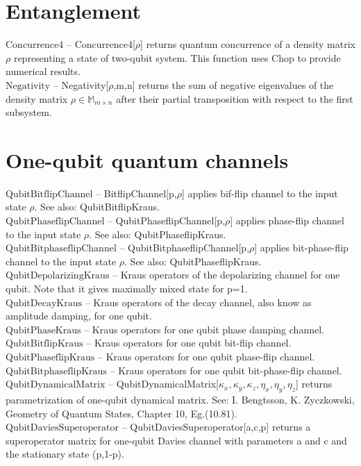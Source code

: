 \documentclass[a4paper,10pt]{scrartcl}
\begin{document}
\section{Entanglement}

\noindent\textbf{$ \text{Concurrence4} $ }-- Concurrence4[$\rho $] returns quantum concurrence of a density matrix $\rho $ representing a state of two-qubit system. This function uses Chop to provide numerical results.$  $\\[8pt]
\noindent\textbf{$ \text{Negativity} $ }-- Negativity[$\rho $,m,n] returns the sum of negative eigenvalues of the density matrix $\rho \in $$ \mathbb{M}_{m\times n} $ after their partial transposition with respect to the first subsystem.$  $\\[8pt]
\section{One-qubit quantum channels}

\noindent\textbf{$ \text{QubitBitflipChannel} $ }-- BitflipChannel[p,$\rho $] applies bif-flip channel to the input state $\rho $. See also: QubitBitflipKraus.$  $\\[8pt]
\noindent\textbf{$ \text{QubitPhaseflipChannel} $ }-- QubitPhaseflipChannel[p,$\rho $] applies phase-flip channel to the input state $\rho $. See also: QubitPhaseflipKraus.$  $\\[8pt]
\noindent\textbf{$ \text{QubitBitphaseflipChannel} $ }-- QubitBitphaseflipChannel[p,$\rho $] applies bit-phase-flip channel to the input state $\rho $. See also: QubitPhaseflipKraus.$  $\\[8pt]
\noindent\textbf{$ \text{QubitDepolarizingKraus} $ }-- Kraus operators of the depolarizing channel for one qubit. Note that it gives maximally mixed state for p=1.$  $\\[8pt]
\noindent\textbf{$ \text{QubitDecayKraus} $ }-- Kraus operators of the decay channel, also know as amplitude damping, for one qubit.$  $\\[8pt]
\noindent\textbf{$ \text{QubitPhaseKraus} $ }-- Kraus operators for one qubit phase damping channel.$  $\\[8pt]
\noindent\textbf{$ \text{QubitBitflipKraus} $ }-- Kraus operators for one qubit bit-flip channel.$  $\\[8pt]
\noindent\textbf{$ \text{QubitPhaseflipKraus} $ }-- Kraus operators for one qubit phase-flip channel.$  $\\[8pt]
\noindent\textbf{$ \text{QubitBitphaseflipKraus} $ }-- Kraus operators for one qubit bit-phase-flip channel.$  $\\[8pt]
\noindent\textbf{$ \text{QubitDynamicalMatrix} $ }-- QubitDynamicalMatrix[$ \kappa _x,\kappa _y,\kappa _z,\eta _x,\eta _y,\eta _z $] returns parametrization of one-qubit dynamical matrix. See: I. Bengtsson, K. Zyczkowski, Geometry of Quantum States, Chapter 10, Eg.(10.81).$  $\\[8pt]
\noindent\textbf{$ \text{QubitDaviesSuperoperator} $ }-- QubitDaviesSuperoperator[a,c,p] returns a superoperator matrix for one-qubit Davies channel with parameters a and c and the stationary state (p,1-p).$  $\\[8pt]
\end{document}
